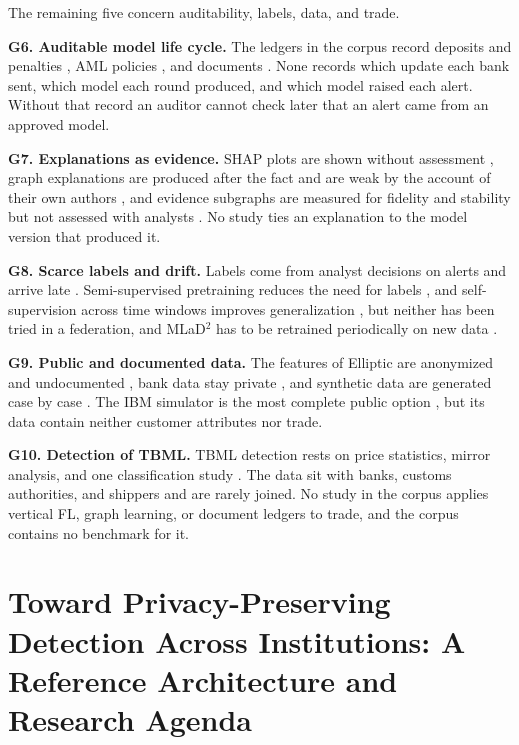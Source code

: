 \documentclass[journal]{IEEEtran}
\begin{document}
The remaining five concern auditability, labels, data, and trade.

\textbf{G6. Auditable model life cycle.} The ledgers in the corpus record deposits and penalties \cite{yang2022accountable}, AML policies \cite{amber2026cbdc}, and documents \cite{cosmin2024notary}. None records which update each bank sent, which model each round produced, and which model raised each alert. Without that record an auditor cannot check later that an alert came from an approved model.

\textbf{G7. Explanations as evidence.} SHAP plots are shown without assessment \cite{awosika2024xai}, graph explanations are produced after the fact and are weak by the account of their own authors \cite{luo2024mlad}, and evidence subgraphs are measured for fidelity and stability but not assessed with analysts \cite{nayak2026quantum}. No study ties an explanation to the model version that produced it.

\textbf{G8. Scarce labels and drift.} Labels come from analyst decisions on alerts and arrive late \cite{jensen2023fighting,irshad2024gcfmld}. Semi-supervised pretraining reduces the need for labels \cite{luo2024mlad}, and self-supervision across time windows improves generalization \cite{nayak2026quantum}, but neither has been tried in a federation, and MLaD$^2$ has to be retrained periodically on new data \cite{luo2024mlad}.

\textbf{G9. Public and documented data.} The features of Elliptic are anonymized and undocumented \cite{ferretti2025gnn}, bank data stay private \cite{irshad2024gcfmld,luo2024mlad}, and synthetic data are generated case by case \cite{amber2026cbdc}. The IBM simulator is the most complete public option \cite{altman2023ibmaml}, but its data contain neither customer attributes nor trade.

\textbf{G10. Detection of TBML.} TBML detection rests on price statistics, mirror analysis, and one classification study \cite{tiwari2025tbml,zdanowicz2009}. The data sit with banks, customs authorities, and shippers and are rarely joined. No study in the corpus applies vertical FL, graph learning, or document ledgers to trade, and the corpus contains no benchmark for it.

\section{Toward Privacy-Preserving Detection Across Institutions: A Reference Architecture and Research Agenda}
\label{sec:arch}
\end{document}
